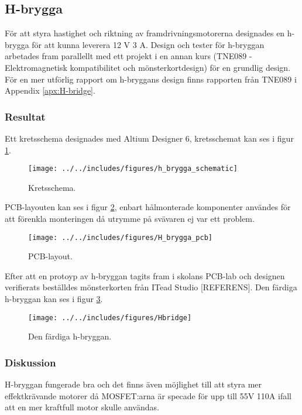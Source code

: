 \subsection{H-brygga}
För att styra hastighet och riktning av framdrivningsmotorerna designades en
h-brygga för att kunna leverera 12 V 3 A. Design och tester för h-bryggan
arbetades fram parallellt med ett projekt i en annan kurs (TNE089 -
Elektromagnetisk kompatibilitet och mönsterkortdesign) för en grundlig design.
För en mer utförlig rapport om h-bryggans design finns rapporten från TNE089 i
Appendix \ref{apx:H-bridge}.

\subsubsection{Resultat}
Ett kretsschema designades med Altium Designer 6, kretsschemat kan ses i figur \ref{fig:h_brygga_schema}.

\begin{landscape}
\begin{figure}[htbp!]
\centering
\texttt{[image: ../../includes/figures/h\_brygga\_schematic]}
\caption{Kretsschema.}
\label{fig:h_brygga_schema}
\end{figure}
\end{landscape}

PCB-layouten kan ses i figur \ref{fig:pcb_layout}, enbart hålmonterade komponenter användes för att förenkla monteringen då utrymme på svävaren ej var ett problem.

\begin{figure}[htbp!]
\centering
\texttt{[image: ../../includes/figures/H\_brygga\_pcb]}
\caption{PCB-layout.}
\label{fig:pcb_layout}
\end{figure}

Efter att en protoyp av h-bryggan tagits fram i skolans PCB-lab och designen verifierats beställdes mönsterkorten från ITead Studio [REFERENS]. Den färdiga h-bryggan kan ses i figur \ref{fig:mounted_h_bridge}.

\begin{figure}[htbp!]
\centering
\texttt{[image: ../../includes/figures/Hbridge]}
\caption{Den färdiga h-bryggan.}
\label{fig:mounted_h_bridge}
\end{figure}

\subsubsection{Diskussion}
H-bryggan fungerade bra och det finns även möjlighet till att styra mer effektkrävande motorer då MOSFET:arna är specade för upp till 55V 110A ifall att en mer kraftfull motor skulle användas.

